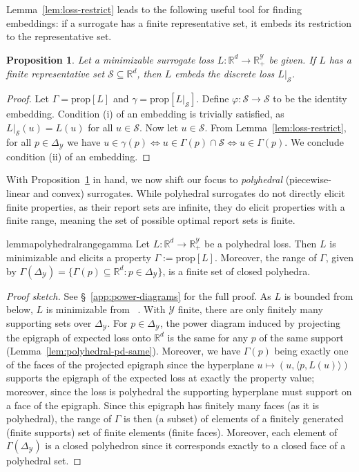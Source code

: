\documentclass[11pt]{article}
\newcommand{\reals}{\mathbb{R}}
\newcommand{\prop}[1]{\mathrm{prop}[#1]}
\newcommand{\simplex}{\Delta_\Y}
\newcommand{\Sc}{\mathcal{S}}
\newcommand{\Y}{\mathcal{Y}}
\newcommand{\inprod}[2]{\langle #1, #2 \rangle}%
\newtheorem{proposition}{Proposition}
\begin{document}
Lemma~\ref{lem:loss-restrict} leads to the following useful tool for finding embeddings: if a surrogate has a finite representative set, it embeds its restriction to the representative set.
\begin{proposition}\label{prop:representative-embeds-restriction}
  Let a minimizable surrogate loss $L:\reals^d \to \reals^\Y_+$ be given.
  If $L$ has a finite representative set $\Sc \subseteq \reals^d$, then $L$ embeds the discrete loss $L|_\Sc$.
\end{proposition}
\begin{proof}
  Let $\Gamma = \prop{L}$ and $\gamma = \prop{L|_\Sc}$.
  Define $\varphi : \Sc \to \Sc$ to be the identity embedding.
  Condition (i) of an embedding is trivially satisfied, as $L|_\Sc(u) = L(u)$ for all $u\in\Sc$.
  Now let $u\in\Sc$.
  From Lemma~\ref{lem:loss-restrict}, for all $p\in\simplex$ we have $u \in \gamma(p) \iff u \in \Gamma(p) \cap \Sc \iff u \in \Gamma(p)$.
  We conclude condition (ii) of an embedding.
\end{proof}


With Proposition~\ref{prop:representative-embeds-restriction} in hand, we now shift our focus to \emph{polyhedral} (piecewise-linear and convex) surrogates.
While polyhedral surrogates do not directly elicit finite properties, as their report sets are infinite, they do elicit properties with a finite range, meaning the set of possible optimal report sets is finite.


\begin{restatable}{lemma}{polyhedralrangegamma}
	\label{lem:polyhedral-range-gamma}
	Let $L:\reals^d\to\reals_+^\Y$ be a polyhedral loss.
  Then $L$ is minimizable and elicits a property $\Gamma := \prop{L}$.
	Moreover, the range of $\Gamma$, given by $\Gamma(\simplex) = \{\Gamma(p) \subseteq \reals^d : p\in\simplex\}$, is a finite set of closed polyhedra.
\end{restatable}
\begin{proof}[Proof sketch]
	See \S~\ref{app:power-diagrams} for the full proof.
	As $L$ is bounded from below, $L$ is minimizable from~\citet[Corollary 19.3.1]{rockafellar1997convex} .
	With $\Y$ finite, there are only finitely many supporting sets over $\simplex$.
	For $p \in \simplex$, the power diagram induced by projecting the epigraph of expected loss onto $\reals^d$ is the same for any $p$ of the same support (Lemma~\ref{lem:polyhedral-pd-same}).
	Moreover, we have $\Gamma(p)$ being exactly one of the faces of the projected epigraph since the hyperplane $u \mapsto (u, \inprod{p}{L(u)})$ supports the epigraph of the expected loss at exactly the property value; moreover, since the loss is polyhedral the supporting hyperplane must support on a face of the epigraph.
	Since this epigraph has finitely many faces (as it is polyhedral), the range of $\Gamma$ is then (a subset) of elements of a finitely generated (finite supports) set of finite elements (finite faces).
	Moreover, each element of $\Gamma(\simplex)$ is a closed polyhedron since it corresponds exactly to a closed face of a polyhedral set.
\end{proof}
\end{document}

